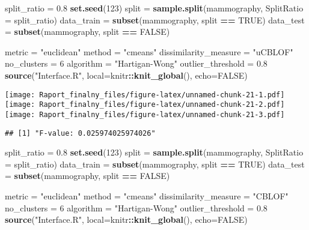 \documentclass[
]{article}
\newenvironment{Shaded}{\begin{snugshade}}{\end{snugshade}}
\newcommand{\DataTypeTok}[1]{\textcolor[rgb]{0.13,0.29,0.53}{#1}}
\newcommand{\DecValTok}[1]{\textcolor[rgb]{0.00,0.00,0.81}{#1}}
\newcommand{\FloatTok}[1]{\textcolor[rgb]{0.00,0.00,0.81}{#1}}
\newcommand{\KeywordTok}[1]{\textcolor[rgb]{0.13,0.29,0.53}{\textbf{#1}}}
\newcommand{\NormalTok}[1]{#1}
\newcommand{\OperatorTok}[1]{\textcolor[rgb]{0.81,0.36,0.00}{\textbf{#1}}}
\newcommand{\OtherTok}[1]{\textcolor[rgb]{0.56,0.35,0.01}{#1}}
\newcommand{\StringTok}[1]{\textcolor[rgb]{0.31,0.60,0.02}{#1}}
\begin{document}
\begin{Shaded}
\begin{Highlighting}[]
\NormalTok{split_ratio =}\StringTok{ }\FloatTok{0.8}
\KeywordTok{set.seed}\NormalTok{(}\DecValTok{123}\NormalTok{)}
\NormalTok{split =}\StringTok{ }\KeywordTok{sample.split}\NormalTok{(mammography, }\DataTypeTok{SplitRatio =}\NormalTok{ split_ratio)}
\NormalTok{data_train =}\StringTok{ }\KeywordTok{subset}\NormalTok{(mammography, split }\OperatorTok{==}\StringTok{ }\OtherTok{TRUE}\NormalTok{)}
\NormalTok{data_test =}\StringTok{ }\KeywordTok{subset}\NormalTok{(mammography, split }\OperatorTok{==}\StringTok{ }\OtherTok{FALSE}\NormalTok{)}

\NormalTok{metric =}\StringTok{ "euclidean"}
\NormalTok{method =}\StringTok{ "cmeans"}
\NormalTok{dissimilarity_measure =}\StringTok{ "uCBLOF"}
\NormalTok{no_clusters =}\StringTok{ }\DecValTok{6}
\NormalTok{algorithm =}\StringTok{ "Hartigan-Wong"}
\NormalTok{outlier_threshold =}\StringTok{ }\FloatTok{0.8}
\KeywordTok{source}\NormalTok{(}\StringTok{"Interface.R"}\NormalTok{, }\DataTypeTok{local=}\NormalTok{knitr}\OperatorTok{::}\KeywordTok{knit_global}\NormalTok{(), }\DataTypeTok{echo=}\OtherTok{FALSE}\NormalTok{)}
\end{Highlighting}
\end{Shaded}

\texttt{[image: Raport\_finalny\_files/figure-latex/unnamed-chunk-21-1.pdf]}
\texttt{[image: Raport\_finalny\_files/figure-latex/unnamed-chunk-21-2.pdf]}
\texttt{[image: Raport\_finalny\_files/figure-latex/unnamed-chunk-21-3.pdf]}

\begin{verbatim}
## [1] "F-value: 0.025974025974026"
\end{verbatim}

\begin{Shaded}
\begin{Highlighting}[]
\NormalTok{split_ratio =}\StringTok{ }\FloatTok{0.8}
\KeywordTok{set.seed}\NormalTok{(}\DecValTok{123}\NormalTok{)}
\NormalTok{split =}\StringTok{ }\KeywordTok{sample.split}\NormalTok{(mammography, }\DataTypeTok{SplitRatio =}\NormalTok{ split_ratio)}
\NormalTok{data_train =}\StringTok{ }\KeywordTok{subset}\NormalTok{(mammography, split }\OperatorTok{==}\StringTok{ }\OtherTok{TRUE}\NormalTok{)}
\NormalTok{data_test =}\StringTok{ }\KeywordTok{subset}\NormalTok{(mammography, split }\OperatorTok{==}\StringTok{ }\OtherTok{FALSE}\NormalTok{)}

\NormalTok{metric =}\StringTok{ "euclidean"}
\NormalTok{method =}\StringTok{ "cmeans"}
\NormalTok{dissimilarity_measure =}\StringTok{ "CBLOF"}
\NormalTok{no_clusters =}\StringTok{ }\DecValTok{6}
\NormalTok{algorithm =}\StringTok{ "Hartigan-Wong"}
\NormalTok{outlier_threshold =}\StringTok{ }\FloatTok{0.8}
\KeywordTok{source}\NormalTok{(}\StringTok{"Interface.R"}\NormalTok{, }\DataTypeTok{local=}\NormalTok{knitr}\OperatorTok{::}\KeywordTok{knit_global}\NormalTok{(), }\DataTypeTok{echo=}\OtherTok{FALSE}\NormalTok{)}
\end{Highlighting}
\end{Shaded}
\end{document}
